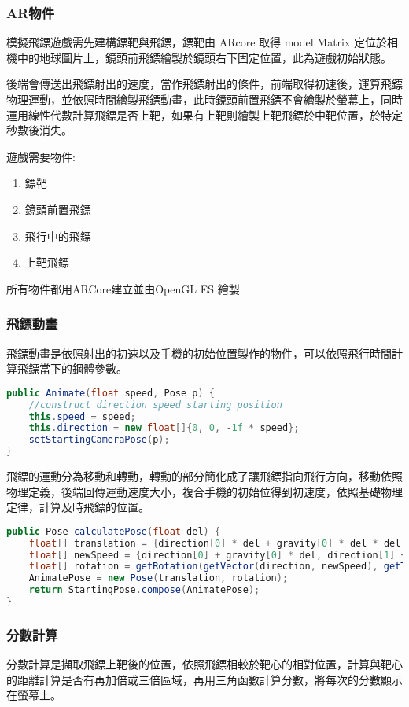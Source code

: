 \subsubsection{AR物件}
模擬飛鏢遊戲需先建構鏢靶與飛鏢，鏢靶由 ARcore 取得 model Matrix 定位於相機中的地球圖片上，鏡頭前飛鏢繪製於鏡頭右下固定位置，此為遊戲初始狀態。

後端會傳送出飛鏢射出的速度，當作飛鏢射出的條件，前端取得初速後，運算飛鏢物理運動，並依照時間繪製飛鏢動畫，此時鏡頭前置飛鏢不會繪製於螢幕上，同時運用線性代數計算飛鏢是否上靶，如果有上靶則繪製上靶飛鏢於中靶位置，於特定秒數後消失。

遊戲需要物件:
\begin{enumerate}
    \item 鏢靶
    \item 鏡頭前置飛鏢
    \item 飛行中的飛鏢
    \item 上靶飛鏢
\end{enumerate}

所有物件都用ARCore建立並由OpenGL ES 繪製

\subsubsection{飛鏢動畫}

飛鏢動畫是依照射出的初速以及手機的初始位置製作的物件，可以依照飛行時間計算飛鏢當下的鋼體參數。

\begin{lstlisting}[language=Java, caption=Animate]
public Animate(float speed, Pose p) {
    //construct direction speed starting position
    this.speed = speed;
    this.direction = new float[]{0, 0, -1f * speed};
    setStartingCameraPose(p);
}
\end{lstlisting}

飛鏢的運動分為移動和轉動，轉動的部分簡化成了讓飛鏢指向飛行方向，移動依照物理定義，後端回傳運動速度大小，複合手機的初始位得到初速度，依照基礎物理定律，計算及時飛鏢的位置。

\begin{lstlisting}[language=Java, caption=calculatePose]
public Pose calculatePose(float del) {
    float[] translation = {direction[0] * del + gravity[0] * del * del, direction[1] * del + gravity[1] * del * del, direction[2] * del + gravity[2] * del * del};
    float[] newSpeed = {direction[0] + gravity[0] * del, direction[1] + gravity[1] * del, direction[2] + gravity[2] * del};
    float[] rotation = getRotation(getVector(direction, newSpeed), getTheta(direction, newSpeed));
    AnimatePose = new Pose(translation, rotation);
    return StartingPose.compose(AnimatePose);
}
\end{lstlisting}

\subsubsection{分數計算}

分數計算是擷取飛鏢上靶後的位置，依照飛鏢相較於靶心的相對位置，計算與靶心的距離計算是否有再加倍或三倍區域，再用三角函數計算分數，將每次的分數顯示在螢幕上。


